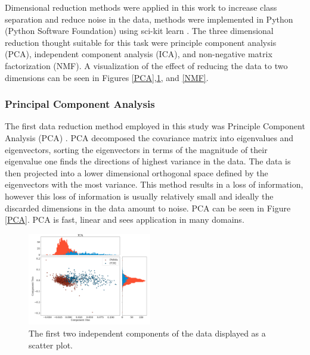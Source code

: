 \documentclass[a4paper,11pt]{article}
\begin{document}
Dimensional reduction methods were applied in this work to increase class separation and reduce noise in the data, methods were implemented in Python (Python Software Foundation) using sci-kit learn \cite{Pedregosa}. The three dimensional reduction thought suitable for this task were principle component analysis (PCA), independent component analysis (ICA), and non-negative matrix factorization (NMF). A visualization of the effect of reducing the data to two dimensions can be seen in Figures \ref{PCA},\ref{ICA}, and \ref{NMF}.

\subsubsection{Principal Component Analysis}

The first data reduction method employed in this study was Principle Component Analysis (PCA) \cite{Jolliffe}. PCA decomposed the covariance matrix into eigenvalues and eigenvectors, sorting the eigenvectors in terms of the magnitude of their eigenvalue one finds the directions of highest variance in the data. The data is then projected into a lower dimensional orthogonal space defined by the eigenvectors with the most variance. This method results in a loss of information, however this loss of information is usually relatively small and ideally the discarded dimensions in the data amount to noise. PCA can be seen in Figure \ref{PCA}. PCA is fast, linear and sees application in many domains. 

\begin{figure}
  
  \begin{center}
    \includegraphics[width=0.48\textwidth]{figures/ICAnone.png}
  \end{center}
  
  \caption{The first two independent components of the data displayed as a scatter plot.}
  
  \label{ICA}
\end{figure}
\end{document}
